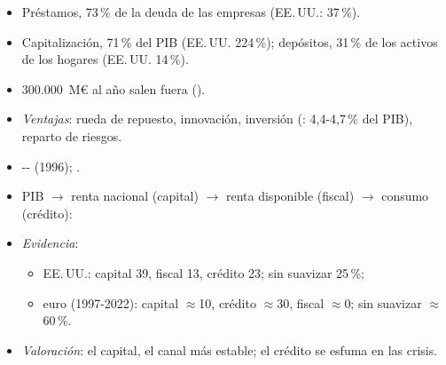 \documentclass{article}
\begin{document}
\begin{columnas}
\begin{itemize}
\item Préstamos, 73\,\% de la deuda de las empresas (EE.\,UU.: 37\,\%).
\item Capitalización, 71\,\% del PIB (EE.\,UU. 224\,\%); depósitos, 31\,\% de los activos de los hogares (EE.\,UU. 14\,\%).
\item 300.000~M€ al año salen fuera ().
\item \emph{Ventajas}: rueda de repuesto, innovación, inversión (: 4,4-4,7\,\% del PIB), reparto de riesgos.
\end{itemize}
\begin{itemize}
\item {}-- (1996);  .
\item PIB $\to$ renta nacional (capital) $\to$ renta disponible (fiscal) $\to$ consumo (crédito):
\item \emph{Evidencia}:
  \begin{itemize}
  \item EE.\,UU.: capital 39, fiscal 13, crédito 23; sin suavizar 25\,\%;
  \item euro (1997-2022): capital $\approx$10, crédito $\approx$30, fiscal $\approx$0; sin suavizar $\approx$60\,\%.
  \end{itemize}
\item \emph{Valoración}: el capital, el canal más estable; el crédito se esfuma en las crisis.
\end{itemize}


\end{columnas}
\end{document}
